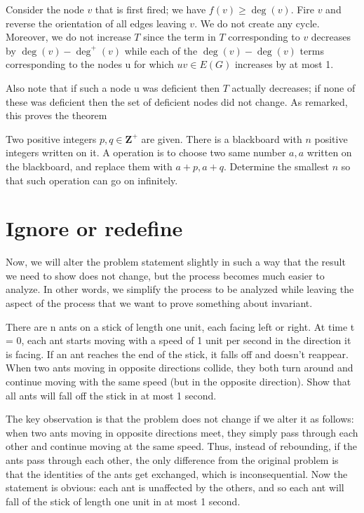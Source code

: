 Consider the node $v$ that is first fired; we have $f(v) \geq \deg(v)$. Fire $v$ and reverse the orientation of all edges leaving $v$. We do not create any cycle. Moreover, we do not increase $T$ since the term in $T$ corresponding to $v$ decreases by $\deg(v) - \deg^+(v)$ while each of the $\deg(v)-\deg(v)$ terms corresponding to the nodes u for which $uv \in E(G)$ increases by at most 1.

Also note that if such a node u was deficient then $T$ actually decreases; if none of these was deficient then the set of deficient nodes did not change. As remarked, this proves the theorem

\begin{example} 
Two positive integers $p,q \in \mathbf{Z}^{+}$ are given. There is a blackboard with $n$ positive integers written on it. A operation is to choose two same number $a,a$ written on the blackboard, and replace them with $a+p,a+q$. Determine the smallest $n$ so that such operation can go on infinitely.
\end{example}

\section{Ignore or redefine}
Now, we will alter the problem statement slightly in such a way that the result we need to show does not change, but the process becomes much easier to analyze. In other words, we simplify the process to be analyzed while leaving the aspect of the process that we want to prove something about invariant. 
\begin{example}
There are n ants on a stick of length one unit, each facing left or 
right. At time t = 0, each ant starts moving with a speed of 1 unit 
per second in the direction it is facing. If an ant reaches the end of 
the stick, it falls off and doesn’t reappear. When two ants moving 
in opposite directions collide, they both turn around and continue 
moving with the same speed (but in the opposite direction). Show 
that all ants will fall off the stick in at most 1 second.
\end{example}
The key observation is that the problem does not change if we alter 
it as follows: when two ants moving in opposite directions meet, 
they simply pass through each other and continue moving at the 
same speed. Thus, instead of rebounding, if the ants pass through 
each other, the only difference from the original problem is that 
the identities of the ants get exchanged, which is inconsequential. 
Now the statement is obvious: each ant is unaffected by the 
others, and so each ant will fall of the stick of length one unit in at 
most 1 second. 

